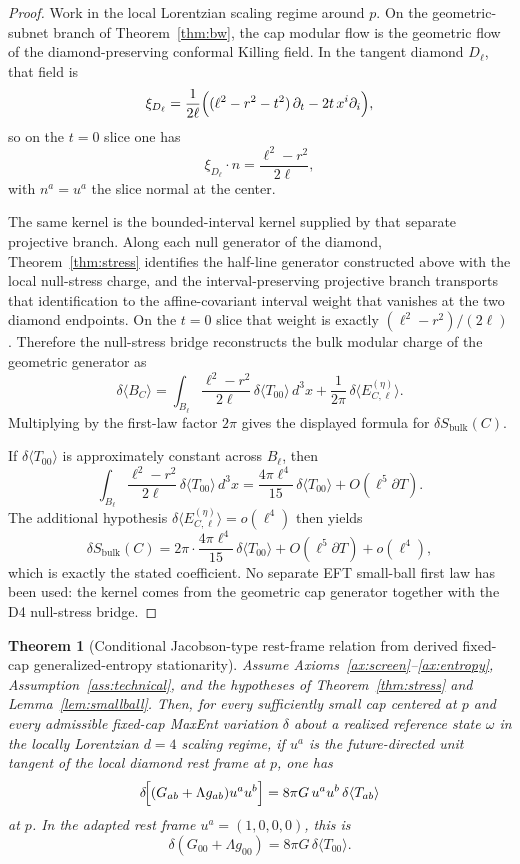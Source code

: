 \documentclass[11pt]{article}
\newtheorem{theorem}{Theorem}[section]
\begin{document}
\begin{proof}
Work in the local Lorentzian scaling regime around $p$. On the geometric-subnet branch of Theorem~\ref{thm:bw}, the cap modular flow is the geometric flow of the diamond-preserving conformal Killing field. In the tangent diamond $D_\ell$, that field is
\[
\xi_{D_\ell}
=
\frac{1}{2\ell}
\Bigl((\ell^2-r^2-t^2)\,\partial_t-2t\,x^i\partial_i\Bigr),
\]
so on the $t=0$ slice one has
\[
\xi_{D_\ell}\!\cdot n=\frac{\ell^2-r^2}{2\ell},
\]
with $n^a=u^a$ the slice normal at the center.

The same kernel is the bounded-interval kernel supplied by that separate projective branch. Along each null generator of the diamond, Theorem~\ref{thm:stress} identifies the half-line generator constructed above with the local null-stress charge, and the interval-preserving projective branch transports that identification to the affine-covariant interval weight that vanishes at the two diamond endpoints. On the $t=0$ slice that weight is exactly $(\ell^2-r^2)/(2\ell)$. Therefore the null-stress bridge reconstructs the bulk modular charge of the geometric generator as
\[
\delta\langle B_C\rangle
=
\int_{B_\ell}\frac{\ell^2-r^2}{2\ell}\,\delta\langle T_{00}\rangle\,d^3x
+\frac{1}{2\pi}\,\delta\langle E^{(\eta)}_{C,\ell}\rangle.
\]
Multiplying by the first-law factor $2\pi$ gives the displayed formula for $\delta S_{\mathrm{bulk}}(C)$.

If $\delta\langle T_{00}\rangle$ is approximately constant across $B_\ell$, then
\[
\int_{B_\ell}\frac{\ell^2-r^2}{2\ell}\,\delta\langle T_{00}\rangle\,d^3x
=
\frac{4\pi\ell^4}{15}\,\delta\langle T_{00}\rangle
+O(\ell^5\partial T).
\]
\noindent
The additional hypothesis $\delta\langle E^{(\eta)}_{C,\ell}\rangle=o(\ell^4)$ then yields
\[
\delta S_{\mathrm{bulk}}(C)
=
2\pi\cdot\frac{4\pi\ell^4}{15}\,\delta\langle T_{00}\rangle
+O(\ell^5\partial T)+o(\ell^4),
\]
which is exactly the stated coefficient. No separate EFT small-ball first law has been used: the kernel comes from the geometric cap generator together with the D4 null-stress bridge.
\end{proof}

\begin{theorem}[Conditional Jacobson-type rest-frame relation from derived fixed-cap generalized-entropy stationarity]\label{thm:einstein}
Assume Axioms~\ref{ax:screen}--\ref{ax:entropy}, Assumption~\ref{ass:technical}, and the hypotheses of Theorem~\ref{thm:stress} and Lemma~\ref{lem:smallball}. Then, for every sufficiently small cap centered at $p$ and every admissible fixed-cap MaxEnt variation $\delta$ about a realized reference state $\omega$ in the locally Lorentzian $d=4$ scaling regime, if $u^a$ is the future-directed unit tangent of the local diamond rest frame at $p$, one has
\[
\delta\!\Bigl[(G_{ab}+\Lambda g_{ab})u^a u^b\Bigr]
=
8\pi G\,u^a u^b\,\delta\langle T_{ab}\rangle
\]
at $p$. In the adapted rest frame $u^a=(1,0,0,0)$, this is
\[
\delta\!\left(G_{00}+\Lambda g_{00}\right)=8\pi G\,\delta\langle T_{00}\rangle.
\]
\end{theorem}
\end{document}
